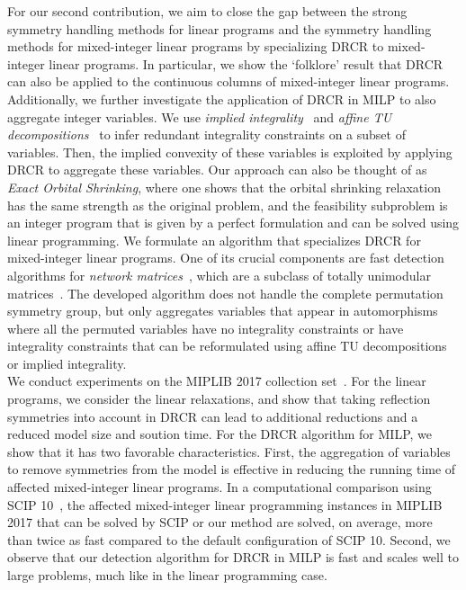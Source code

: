 \documentclass[pdflatex,sn-mathphys-num]{sn-jnl}%
\theoremstyle{thmstyleone}%
\theoremstyle{thmstylethree}%
\theoremstyle{thmstyletwo}%
\begin{document}
For our second contribution, we aim to close the gap between the strong symmetry handling methods for linear programs and the symmetry handling methods for mixed-integer linear programs by specializing DRCR to mixed-integer linear programs.  
In particular, we show the `folklore' result that DRCR can also be applied to the continuous columns of mixed-integer linear programs. 
Additionally, we further investigate the application of DRCR in MILP to also aggregate integer variables. We use \emph{implied integrality}~\cite{VanDerHulst2025} and \emph{affine TU decompositions}~\cite{BaderHWZ18} to infer redundant integrality constraints on a subset of variables. Then, the implied convexity of these variables is exploited by applying DRCR to aggregate these variables. Our approach can also be thought of as \emph{Exact Orbital Shrinking}, where one shows that the orbital shrinking relaxation has the same strength as the original problem, and the feasibility subproblem is an integer program that is given by a perfect formulation and can be solved using linear programming. We formulate an algorithm that specializes DRCR for mixed-integer linear programs. 
One of its crucial components are fast detection algorithms for \emph{network matrices}~\cite{BixbyWagner1988,RowNetworkMatrixPaper}, which are a subclass of totally unimodular matrices~\cite{Schrijver86}. The developed algorithm does not handle the complete permutation symmetry group, but only aggregates variables that appear in automorphisms where all the permuted variables have no integrality constraints or have integrality constraints that can be reformulated using affine TU decompositions or implied integrality. \\

We conduct experiments on the MIPLIB 2017 collection set~\cite{Gleixner2021}. For the linear programs, we consider the linear relaxations, and show that taking reflection symmetries into account in DRCR can lead to additional reductions and a reduced model size and soution time. For the DRCR algorithm for MILP, we show that it has two favorable characteristics. First, the aggregation of variables to remove symmetries from the model is effective in reducing the running time of affected mixed-integer linear programs. In a computational comparison using SCIP 10~\cite{hojny2025scipoptimizationsuite100}, the affected mixed-integer linear programming instances in MIPLIB 2017 that can be solved by SCIP or our method are solved, on average, more than twice as fast compared to the default configuration of SCIP 10. 
Second, we observe that our detection algorithm for DRCR in MILP is fast and scales well to large problems, much like in the linear programming case.
\end{document}
